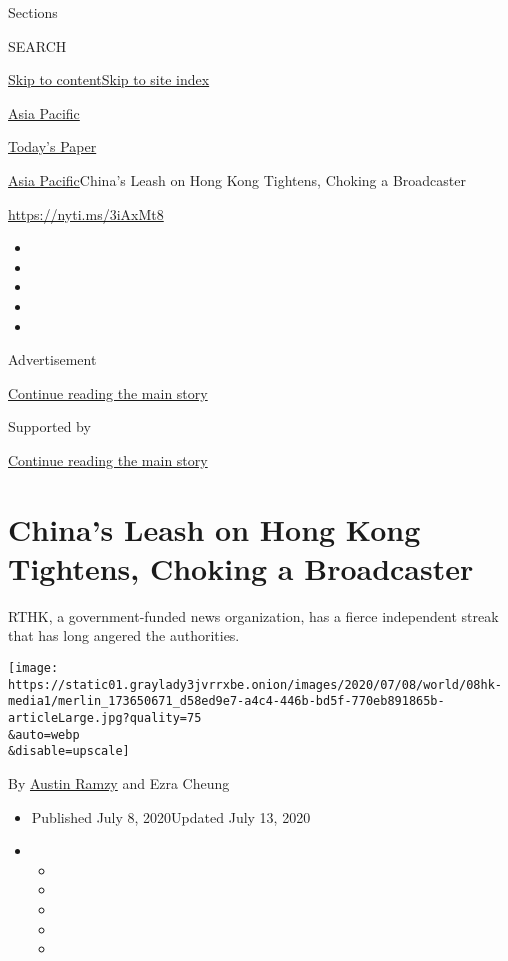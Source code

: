 Sections

SEARCH

\protect\hyperlink{site-content}{Skip to
content}\protect\hyperlink{site-index}{Skip to site index}

\href{https://www.nytimes3xbfgragh.onion/section/world/asia}{Asia
Pacific}

\href{https://myaccount.nytimes3xbfgragh.onion/auth/login?response_type=cookie\&client_id=vi}{}

\href{https://www.nytimes3xbfgragh.onion/section/todayspaper}{Today's
Paper}

\href{/section/world/asia}{Asia Pacific}\textbar{}China's Leash on Hong
Kong Tightens, Choking a Broadcaster

\url{https://nyti.ms/3iAxMt8}

\begin{itemize}
\item
\item
\item
\item
\item
\end{itemize}

Advertisement

\protect\hyperlink{after-top}{Continue reading the main story}

Supported by

\protect\hyperlink{after-sponsor}{Continue reading the main story}

\hypertarget{chinas-leash-on-hong-kong-tightens-choking-a-broadcaster}{%
\section{China's Leash on Hong Kong Tightens, Choking a
Broadcaster}\label{chinas-leash-on-hong-kong-tightens-choking-a-broadcaster}}

RTHK, a government-funded news organization, has a fierce independent
streak that has long angered the authorities.

\texttt{[image: https://static01.graylady3jvrrxbe.onion/images/2020/07/08/world/08hk-media1/merlin\_173650671\_d58ed9e7-a4c4-446b-bd5f-770eb891865b-articleLarge.jpg?quality=75\\\&auto=webp\\\&disable=upscale]}

By \href{https://www.nytimes3xbfgragh.onion/by/austin-ramzy}{Austin
Ramzy} and Ezra Cheung

\begin{itemize}
\item
  Published July 8, 2020Updated July 13, 2020
\item
  \begin{itemize}
  \item
  \item
  \item
  \item
  \item
  \end{itemize}
\end{itemize}

